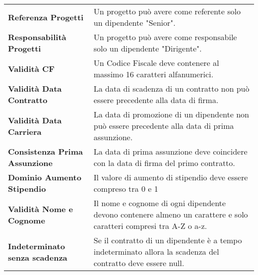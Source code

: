 \begin{xltabular}{\textwidth}{l X}
        \textbf{Referenza Progetti} & Un progetto può avere come referente solo un dipendente "Senior". \\

        \textbf{Responsabilità Progetti} & Un progetto può avere come responsabile solo un dipendente "Dirigente". \\

        \textbf{Validità CF} & Un Codice Fiscale deve contenere al massimo 16 caratteri alfanumerici. \\
\hline
        \textbf{Validità Data Contratto} & La data di scadenza di un contratto non può essere precedente alla data di firma. \\

        \textbf{Validità Data Carriera} & La data di promozione di un dipendente non può essere precedente alla data di prima assunzione. \\

        \textbf{Consistenza Prima Assunzione} & La data di prima assunzione deve coincidere con la data di firma del primo contratto. \\

        \textbf{Dominio Aumento Stipendio} & Il valore di aumento di stipendio deve essere compreso tra 0 e 1 \\

        \textbf{Validità Nome e Cognome} & Il nome e cognome di ogni dipendente devono contenere almeno un carattere e solo caratteri compresi tra A-Z o a-z. \\

        \textbf{Indeterminato senza scadenza} &Se il contratto di un dipendente è a tempo indeterminato allora la scadenza del contratto deve essere null. \\
    \end{xltabular}
\endgroup
